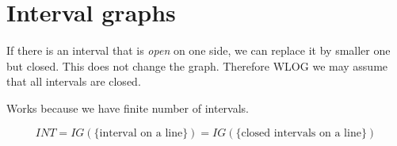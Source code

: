 \section{\texorpdfstring{Interval graphs}{Interval graphs}}
\vspace{5mm}
\large

If there is an interval that is \emph{open} on one side, we can replace it by smaller one but closed.
This does not change the graph.
Therefore WLOG we may assume that all intervals are closed.

Works because we have finite number of intervals.

\begin{definition}
	\[ INT = IG(\{\text{interval on a line}\}) = IG(\{\text{closed intervals on a line}\}) \]
\end{definition}

